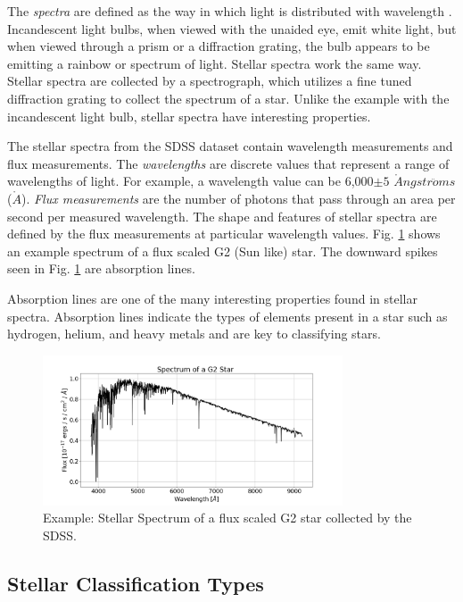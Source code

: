 \documentclass[conference]{IEEEtran}
\begin{document}
        The \textit{spectra} are  defined as the way in which light is distributed with wavelength \cite{Chromey}. Incandescent light bulbs, when viewed with the unaided eye, emit white light, but when viewed through a prism or a diffraction grating, the bulb appears to be emitting a rainbow or spectrum of light. Stellar spectra work the same way. Stellar spectra are collected by a spectrograph, which utilizes a fine tuned diffraction grating to collect the spectrum of a star. Unlike the example with the incandescent light bulb, stellar spectra have interesting properties. 

        The stellar spectra from the SDSS dataset contain wavelength measurements and flux measurements. The \textit{wavelengths} are discrete values that represent a range of wavelengths of light. For example, a wavelength value can be 6,000$\pm5$ $\mathring{A}ngstr\ddot{o}ms$ ($\mathring{A}$). \textit{Flux measurements} are the number of photons that pass through an area per second per measured wavelength. The shape and features of stellar spectra are defined by the flux measurements at particular wavelength values. Fig. \ref{fig:G2} shows an example spectrum of a flux scaled G2 (Sun like) star. The downward spikes seen in Fig. \ref{fig:G2} are absorption lines.

	Absorption lines are one of the many interesting properties found in stellar spectra. Absorption lines indicate the types of elements present in a star such as hydrogen, helium, and heavy metals and are key to classifying stars.
        
        \begin{figure}
            \centering
            \includegraphics[width=3.5in]{G2.png}
            \caption{Example: Stellar Spectrum of a flux scaled G2 star collected by the SDSS.}
            \label{fig:G2}
        \end{figure}

	\subsection{Stellar Classification Types}\label{sec:classes}
\end{document}
